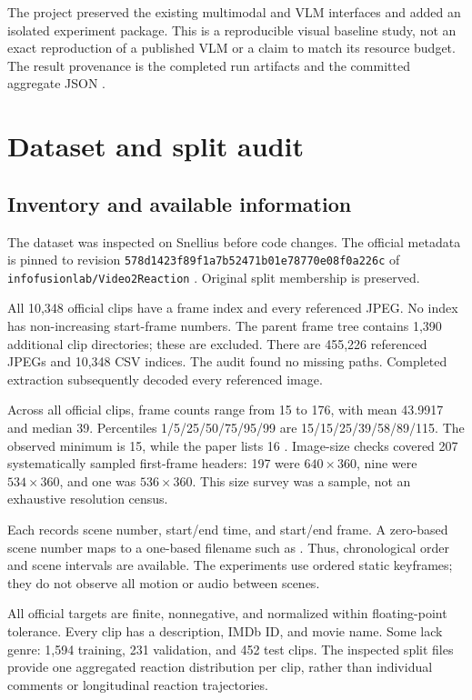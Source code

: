 \documentclass[11pt,a4paper]{article}
\newcommand{\tbl}[1]{\FloatBarrier}
\begin{document}
The project preserved the existing multimodal and VLM interfaces and added an isolated experiment package. This is a reproducible visual baseline study, not an exact reproduction of a published VLM or a claim to match its resource budget. The result provenance is the completed run artifacts and the committed aggregate JSON \cite{results,code}.

\section{Dataset and split audit}
\subsection{Inventory and available information}
The dataset was inspected on Snellius before code changes. The official metadata is pinned to revision \nolinkurl{578d1423f89f1a7b52471b01e78770e08f0a226c} of \nolinkurl{infofusionlab/Video2Reaction} \cite{dataset}. Original split membership is preserved.
\tbl{dataset}

All 10,348 official clips have a frame index and every referenced JPEG. No index has non-increasing start-frame numbers. The parent frame tree contains 1,390 additional clip directories; these are excluded. There are 455,226 referenced JPEGs and 10,348 CSV indices. The audit found no missing paths. Completed extraction subsequently decoded every referenced image.

Across all official clips, frame counts range from 15 to 176, with mean 43.9917 and median 39. Percentiles 1/5/25/50/75/95/99 are 15/15/25/39/58/89/115. The observed minimum is 15, while the paper lists 16 \cite{paper}. Image-size checks covered 207 systematically sampled first-frame headers: 197 were $640\times360$, nine were $534\times360$, and one was $536\times360$. This size survey was a sample, not an exhaustive resolution census.

Each  records scene number, start/end time, and start/end frame. A zero-based scene number maps to a one-based filename such as . Thus, chronological order and scene intervals are available. The experiments use ordered static keyframes; they do not observe all motion or audio between scenes.

All official targets are finite, nonnegative, and normalized within floating-point tolerance. Every clip has a description, IMDb ID, and movie name. Some lack genre: 1,594 training, 231 validation, and 452 test clips. The inspected split files provide one aggregated reaction distribution per clip, rather than individual comments or longitudinal reaction trajectories.
\end{document}
